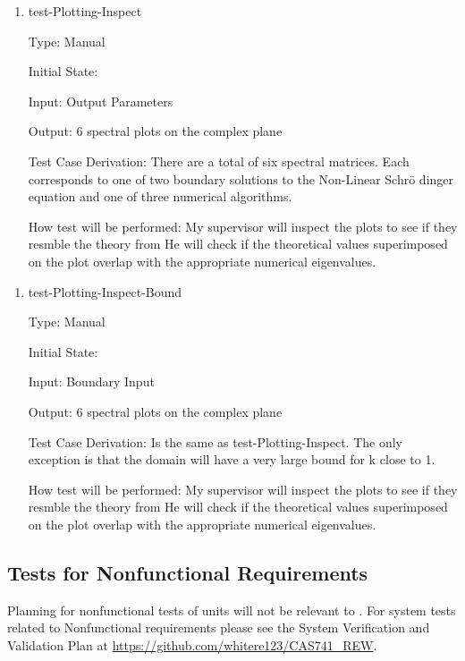 \documentclass[12pt, titlepage]{article}
\begin{document}
\begin{enumerate}				
	\item{test-Plotting-Inspect\\}
	
	Type: Manual
	
	Initial State: 
	
	Input: Output Parameters
	
	Output: 6 spectral plots on the complex plane
	
	Test Case Derivation: There are a total of six spectral matrices. Each 
	corresponds to one of two boundary solutions to the Non-Linear Schr\"{o} 
	dinger equation and one of three numerical algorithms. 
	
	How test will be performed: My supervisor will inspect the plots to see if 
	they resmble the theory from \cite{SegaletAl} He will check if the 
	theoretical 
	values superimposed on the plot overlap with the appropriate numerical 
	eigenvalues. 
\end{enumerate} 

\begin{enumerate}				
	\item{test-Plotting-Inspect-Bound\\}
	
	Type: Manual
	
	Initial State: 
	
	Input: Boundary Input
	
	Output: 6 spectral plots on the complex plane
	
	Test Case Derivation: Is the same as test-Plotting-Inspect. The only 
	exception is that the domain will have a very large bound for k close to 1.
	
	How test will be performed: My supervisor will inspect the plots to see if 
	they resmble the theory from \cite{SegaletAl} He will check if the 
	theoretical 
	values superimposed on the plot overlap with the appropriate numerical 
	eigenvalues. 
\end{enumerate}

\subsection{Tests for Nonfunctional Requirements}

Planning for nonfunctional tests of units will not be relevant to \progname. 
For system tests related to Nonfunctional requirements please see the System 
Verification and Validation Plan at 
\url{https://github.com/whitere123/CAS741_REW}. 
\end{document}
